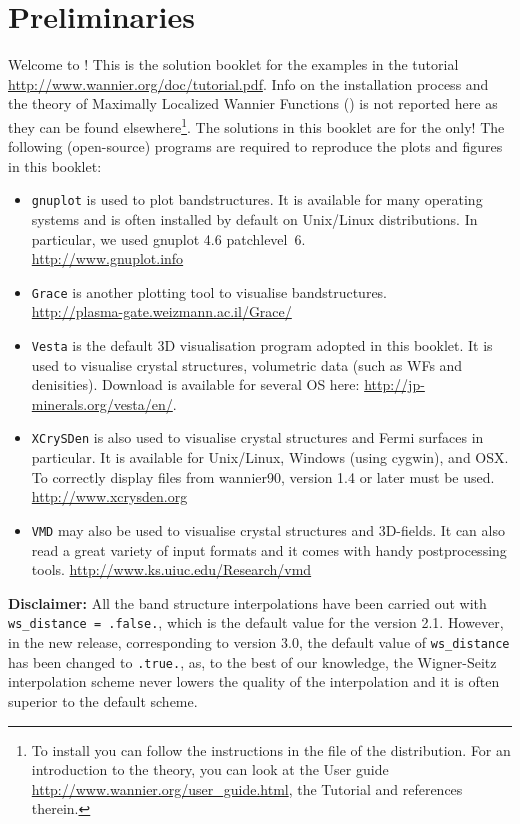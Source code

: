 \section*{Preliminaries}
\label{sec:preliminaries}
Welcome to \Wannier{}! This is the solution booklet for the examples in the \Wannier{} \version{} tutorial \mbox{\url{http://www.wannier.org/doc/tutorial.pdf}}.  
Info on the installation process and the theory of Maximally Localized Wannier Functions (\MLWFs) is not reported here as they can be found elsewhere\footnote{\footnotesize{To install \Wannier{} you can follow the instructions in the  file of the \Wannier{} distribution. For an introduction to the theory, you can look at the \Wannier{} User guide \url{http://www.wannier.org/user_guide.html}, the \Wannier{} Tutorial and references therein.}}. The solutions in this booklet are for the \version{} only! The following (open-source) programs are required to reproduce the plots and figures in this booklet:
\begin{itemize}
\item \texttt{gnuplot} is used to plot bandstructures. It is available for many operating systems and is often
installed by default on Unix/Linux distributions. In particular, we used gnuplot 4.6 patchlevel~6.\\ 
\url{http://www.gnuplot.info}
\item \texttt{Grace} is another plotting tool to visualise bandstructures. \\ 
\url{http://plasma-gate.weizmann.ac.il/Grace/}
\item \texttt{Vesta} is the default 3D visualisation program\cite{vesta} adopted in this booklet. It is used to visualise crystal structures, volumetric data (such as WFs and  denisities).
Download is available for several OS here: \url{http://jp-minerals.org/vesta/en/}.
\item \texttt{XCrySDen} is also used to visualise crystal structures and Fermi surfaces in particular. It is available
for Unix/Linux, Windows (using cygwin), and OSX. To correctly display files from wannier90,
version 1.4 or later must be used. \\ 
\url{http://www.xcrysden.org}
\item \texttt{VMD} may also be used to visualise crystal structures and 3D-fields. It can also read a great variety of input formats and it comes with handy postprocessing tools.
\url{http://www.ks.uiuc.edu/Research/vmd}
\end{itemize}

\textbf{Disclaimer:} All the band structure interpolations have been carried out with \mbox{{\tt ws\_distance = .false.}}, which is the default value for the version 2.1. However, in the new \Wannier{} release, corresponding to version 3.0, the default value of {\tt ws\_distance} has been changed to {\tt .true.}, as, to the best of our knowledge, the Wigner-Seitz interpolation scheme never lowers the quality of the interpolation and it is often superior to the default scheme.  
